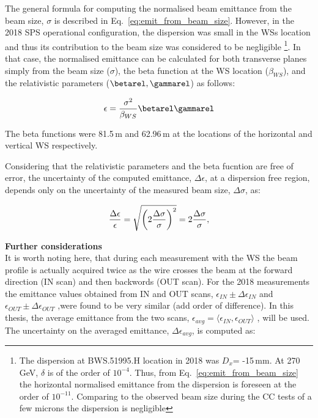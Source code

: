 The general formula for computing the normalised beam emittance from the beam size, $\sigma$ is described in Eq.~\eqref{eq:emit_from_beam_size}. However, in the 2018 SPS operational configuration, the dispersion was small in the WSs location and thus its contribution to the beam size was considered to be negligible \footnote{The dispersion at BWS.51995.H location in 2018 was $D_x$= -15\,mm. At 270\,GeV, $\delta$ is of the order of $\mathrm{10^{-4}}$. Thus, from Eq.~\eqref{eq:emit_from_beam_size} the horizontal normalised emittance from the dispersion is foreseen at the order of $\mathrm{10^{-11}}$. Comparing to the observed beam size during the CC tests of a few microns the dispersion is negligible}. In that case, the normalised emittance can be calculated for both transverse planes simply from the beam size ($\sigma$), the beta function at the WS location ($\beta_{WS}$), and the relativistic parameters ($\betarel, \gammarel$) as follows:

\begin{equation}\label{eq:emittance_from_WS}
   \centering
   \epsilon = \frac{\sigma^2}{\beta_{WS}} \betarel \gammarel
\end{equation}

The beta functions were 81.5\,m and 62.96\,m at the locations of the horizontal and vertical WS respectively.

Considering that the relativistic parameters and the beta fucntion are free of error, the uncertainty of the computed emittance, $\Delta \epsilon$, at a dispersion free region, depends only on the uncertainty of the measured beam size, $\Delta \sigma$, as:

\begin{equation}\label{eq:emittance_from_WS_uncertainty}
   \centering
   \frac{\Delta \epsilon}{\epsilon} = \sqrt{\left(2\frac{\Delta \sigma}{\sigma} \right)^2} = 2\frac{\Delta \sigma}{\sigma},
\end{equation}


\normalsize{\textbf{Further considerations}}\\
It is worth noting here, that during each measurement with the WS the beam profile is actually acquired twice as the wire crosses the beam at the forward direction (IN scan) and then backwords (OUT scan). For the 2018 measurements the emittance values obtained from IN and OUT scans, $\epsilon_{IN} \pm \Delta \epsilon_{IN}$ and $\epsilon_{OUT} \pm \Delta \epsilon_{OUT}$ ,were found to be very similar (add order of difference). In this thesis, the average emittance from the two scans, $\epsilon_{avg} = \langle \epsilon_{IN}, \epsilon_{OUT}\rangle$ , will be used. The uncertainty on the averaged emittance, $\Delta \epsilon_{avg}$, is computed as:

